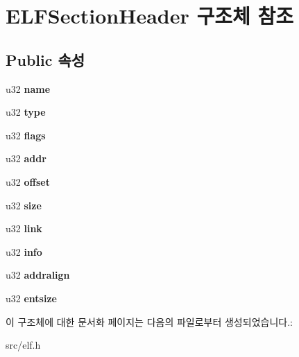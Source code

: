 \hypertarget{struct_e_l_f_section_header}{}\section{E\+L\+F\+Section\+Header 구조체 참조}
\label{struct_e_l_f_section_header}
\subsection*{Public 속성}
\begin{DoxyCompactItemize}
\item 
\mbox{\label{struct_e_l_f_section_header_a241671009a9056df615f8b5067e1e08d}} 
u32 {\bfseries name}
\item 
\mbox{\label{struct_e_l_f_section_header_a0e73af321f9f8f29d7696211bdfbe98e}} 
u32 {\bfseries type}
\item 
\mbox{\label{struct_e_l_f_section_header_ace9a02b7d152576f2358c23e6d37bf79}} 
u32 {\bfseries flags}
\item 
\mbox{\label{struct_e_l_f_section_header_afc725f235fad23731a2440a008eb47d0}} 
u32 {\bfseries addr}
\item 
\mbox{\label{struct_e_l_f_section_header_af1fc22111db70b6b813f0da79e9cca04}} 
u32 {\bfseries offset}
\item 
\mbox{\label{struct_e_l_f_section_header_a4c1eb98142e250c761f54d89388e86ab}} 
u32 {\bfseries size}
\item 
\mbox{\label{struct_e_l_f_section_header_a014584caf23f4eed364275b233fbd131}} 
u32 {\bfseries link}
\item 
\mbox{\label{struct_e_l_f_section_header_adb23769fc4cda28b806d105979253855}} 
u32 {\bfseries info}
\item 
\mbox{\label{struct_e_l_f_section_header_a373d42b2260c33d6c03eb14f0a76ec42}} 
u32 {\bfseries addralign}
\item 
\mbox{\label{struct_e_l_f_section_header_a87a3476993e99119cc8a46f4ec099fc1}} 
u32 {\bfseries entsize}
\end{DoxyCompactItemize}


이 구조체에 대한 문서화 페이지는 다음의 파일로부터 생성되었습니다.\+:\begin{DoxyCompactItemize}
\item 
src/elf.\+h\end{DoxyCompactItemize}
